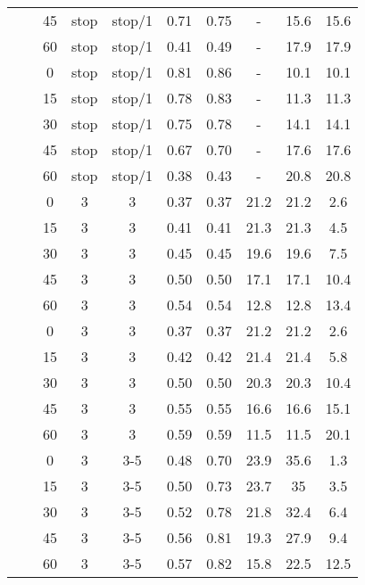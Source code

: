 \begin{longtable}[h!]{cccccccccc}
\nopagebreak
&  & 45 & stop & stop/1 & 0.71 & 0.75 & - & 15.6 & 15.6\\
\nopagebreak
& \multirow{-5}{*}{\centering\arraybackslash 0.2} & 60 & stop & stop/1 & 0.41 & 0.49 & - & 17.9 & 17.9\\
\nopagebreak
&  & 0 & stop & stop/1 & 0.81 & 0.86 & - & 10.1 & 10.1\\
\nopagebreak
&  & 15 & stop & stop/1 & 0.78 & 0.83 & - & 11.3 & 11.3\\
\nopagebreak
&  & 30 & stop & stop/1 & 0.75 & 0.78 & - & 14.1 & 14.1\\
\nopagebreak
&  & 45 & stop & stop/1 & 0.67 & 0.70 & - & 17.6 & 17.6\\
\nopagebreak
\multirow{-10}{*}{\centering\arraybackslash 5} & \multirow{-5}{*}{\centering\arraybackslash 0.33} & 60 & stop & stop/1 & 0.38 & 0.43 & - & 20.8 & 20.8\\
\cmidrule{1-10}\pagebreak[0]
&  & 0 & 3 & 3 & 0.37 & 0.37 & 21.2 & 21.2 & 2.6\\
\nopagebreak
&  & 15 & 3 & 3 & 0.41 & 0.41 & 21.3 & 21.3 & 4.5\\
\nopagebreak
&  & 30 & 3 & 3 & 0.45 & 0.45 & 19.6 & 19.6 & 7.5\\
\nopagebreak
&  & 45 & 3 & 3 & 0.50 & 0.50 & 17.1 & 17.1 & 10.4\\
\nopagebreak
& \multirow{-5}{*}{\centering\arraybackslash 0.2} & 60 & 3 & 3 & 0.54 & 0.54 & 12.8 & 12.8 & 13.4\\
\nopagebreak
&  & 0 & 3 & 3 & 0.37 & 0.37 & 21.2 & 21.2 & 2.6\\
\nopagebreak
&  & 15 & 3 & 3 & 0.42 & 0.42 & 21.4 & 21.4 & 5.8\\
\nopagebreak
&  & 30 & 3 & 3 & 0.50 & 0.50 & 20.3 & 20.3 & 10.4\\
\nopagebreak
&  & 45 & 3 & 3 & 0.55 & 0.55 & 16.6 & 16.6 & 15.1\\
\nopagebreak
\multirow{-10}{*}{\centering\arraybackslash 6} & \multirow{-5}{*}{\centering\arraybackslash 0.33} & 60 & 3 & 3 & 0.59 & 0.59 & 11.5 & 11.5 & 20.1\\
\cmidrule{1-10}\pagebreak[0]
&  & 0 & 3 & 3-5 & 0.48 & 0.70 & 23.9 & 35.6 & 1.3\\
\nopagebreak
&  & 15 & 3 & 3-5 & 0.50 & 0.73 & 23.7 & 35 & 3.5\\
\nopagebreak
&  & 30 & 3 & 3-5 & 0.52 & 0.78 & 21.8 & 32.4 & 6.4\\
\nopagebreak
&  & 45 & 3 & 3-5 & 0.56 & 0.81 & 19.3 & 27.9 & 9.4\\
\nopagebreak
& \multirow{-5}{*}{\centering\arraybackslash 0.2} & 60 & 3 & 3-5 & 0.57 & 0.82 & 15.8 & 22.5 & 12.5\\

\end{longtable}
